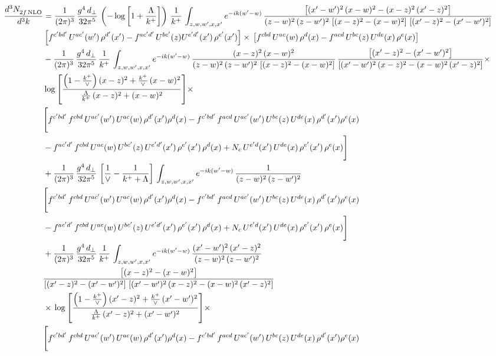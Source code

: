 \documentclass[9pt]{article}
\numberwithin{equation}{section}
\begin{document}
\begin{align}
    \frac{d^{3}N_{2f\,\rm NLO}^{\rm}}{d^{3}k}  & = \frac{1}{(2\pi)^{3}}\, \frac{g^{4}\,d_{\perp}}{32\pi^{5}}\,\left(-\log{\left[1+\frac{\Lambda}{k^{+}}\right]}\right)\,\frac{1}{k^{+}}\,\int_{z,w,w^{\prime},x,x'} e^{-ik(w^{\prime}-w)}\,\frac{\left[(x'-w')^{2}\, (x-w)^{2} - (x-z)^{2}\, (x'-z)^{2}\right]}{(z-w)^{2}\, (z-w')^{2}\,\left[(x-z)^{2} - (x-w)^{2}\right]\, \left[(x'-z)^{2} - (x'-w')^{2}\right]}\notag \\ &   \left[f^{c'bd'}\, U^{ac'}(w')\,\rho^{d'}(x')-f^{ac'd'}\, U^{bc'}(z)U^{e'd'}(x')\, \rho^{e'}(x')\right]\times\, \left[f^{cbd}\, U^{ac}(w)\,\rho^{d}(x) - f^{acd}\, U^{bc}(z)\,U^{de}(x)\, \rho^{e}(x)\right] \notag \\ & - \frac{1}{(2\pi)^{3}}\, \frac{g^{4}\,d_{\perp}}{32\pi^{5}}\,\frac{1}{k^{+}}\,\int_{z,w,w^{\prime},x,x'} e^{-ik(w^{\prime}-w)}\,\frac{(x-z)^{2}\, (x-w)^{2}}{(z-w)^{2}\, (z-w')^{2}\,\left[(x-z)^{2} - (x-w)^{2}\right]}\,\frac{\left[(x'-z)^{2}-(x'-w')^{2}\right]}{\left[(x'-w')^{2}\, (x-z)^{2} - (x-w)^{2}\, (x'-z)^{2}\right]}\times\notag \\ & \log{\left[\frac{\left(1-\frac{k^{+}}{\vee}\right)(x-z)^{2}+\frac{k^{+}}{\vee}\,(x-w)^{2}}{\frac{\Lambda}{k^{+}}\,(x-z)^{2}+(x-w)^{2}}\right]}\times\notag \\ & \Bigg[f^{c'bd'}\,f^{cbd}\, U^{ac'}(w')\,U^{ac}(w)\,\rho^{d'}(x')\rho^{d}(x)- f^{c'bd'}\,f^{acd}\,U^{ac'}(w')\,U^{bc}(z)\,U^{de}(x)\,\rho^{d'}(x')\rho^{e}(x) \notag \\ & -f^{ac'd'}\,f^{cbd}\,U^{ac}(w)\,U^{bc'}(z)\,U^{e'd'}(x')\,\rho^{e'}(x')\,\rho^{d}(x) +N_{c}\,U^{e'd}(x')\,U^{de}(x)\,\rho^{e'}(x')\,\rho^{e}(x)\Bigg] \notag \\ & + \frac{1}{(2\pi)^{3}}\, \frac{g^{4}\,d_{\perp}}{32\pi^{5}}\,\left[\frac{1}{\vee} - \frac{1}{k^{+} + \Lambda}\right]\,\int_{z,w,w^{\prime},x,x'} e^{-ik(w^{\prime}-w)}\,\frac{1}{(z-w)^{2}\, (z-w')^{2}}\notag \\ & \Bigg[f^{c'bd'}\,f^{cbd}\, U^{ac'}(w')\,U^{ac}(w)\,\rho^{d'}(x')\rho^{d}(x)- f^{c'bd'}\,f^{acd}\,U^{ac'}(w')\,U^{bc}(z)\,U^{de}(x)\,\rho^{d'}(x')\rho^{e}(x) \notag \\ & -f^{ac'd'}\,f^{cbd}\,U^{ac}(w)\,U^{bc'}(z)\,U^{e'd'}(x')\,\rho^{e'}(x')\,\rho^{d}(x) +N_{c}\,U^{e'd}(x')\,U^{de}(x)\,\rho^{e'}(x')\,\rho^{e}(x)\Bigg] \notag \\ & + \frac{1}{(2\pi)^{3}}\, \frac{g^{4}\,d_{\perp}}{32\pi^{5}}\,\frac{1}{k^{+}}\,\int_{z,w,w^{\prime},x,x'} e^{-ik(w^{\prime}-w)}\,\frac{(x'-w')^{2}\, (x'-z)^{2}}{(z-w)^{2}\, (z-w')^{2}}\notag \\ & \frac{\left[(x-z)^{2} - (x-w)^{2}\right]}{\left[(x'-z)^{2} - (x'-w')^{2}\right]\, \left[(x'-w')^{2}\, (x - z)^{2} - (x-w)^{2}\,(x'-z)^{2}\right]}\notag \\ & \times\, \log{\left[\frac{\left(1-\frac{k^{+}}{\vee}\right)(x'-z)^{2}+\frac{k^{+}}{\vee}\,(x'-w')^{2}}{\frac{\Lambda}{k^{+}}\,(x'-z)^{2}+(x'-w')^{2}}\right]}\times \notag \\ &  \Bigg[f^{c'bd'}\,f^{cbd}\, U^{ac'}(w')\,U^{ac}(w)\,\rho^{d'}(x')\rho^{d}(x)- f^{c'bd'}\,f^{acd}\,U^{ac'}(w')\,U^{bc}(z)\,U^{de}(x)\,\rho^{d'}(x')\rho^{e}(x) \notag \\ & 
\end{align}
\end{document}
